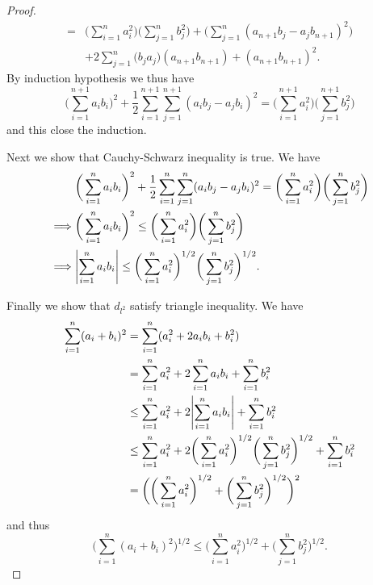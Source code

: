 \begin{proof}
\begin{align*}
        = & \bigg(\sum_{i = 1}^n a_i^2\bigg) \bigg(\sum_{j = 1}^n b_j^2\bigg) + \bigg(\sum_{j = 1}^n (a_{n + 1} b_j - a_j b_{n + 1})^2\bigg)                                                          \\
          & + 2 \sum_{j = 1}^n \bigg(b_j a_j\bigg)(a_{n + 1} b_{n + 1}) + (a_{n + 1} b_{n + 1})^2.
    \end{align*}
    By induction hypothesis we thus have
    \[
        \bigg(\sum_{i = 1}^{n + 1} a_i b_i\bigg)^2 + \frac{1}{2} \sum_{i = 1}^{n + 1} \sum_{j = 1}^{n + 1} (a_i b_j - a_j b_i)^2 = \bigg(\sum_{i = 1}^{n + 1} a_i^2\bigg) \bigg(\sum_{j = 1}^{n + 1} b_j^2\bigg)
    \]
    and this close the induction.

    Next we show that Cauchy-Schwarz inequality is true.
    We have
    \begin{align*}
                 & \bigg(\sum_{i = 1}^n a_i b_i\bigg)^2 + \frac{1}{2} \sum_{i = 1}^n \sum_{j = 1}^n (a_i b_j - a_j b_i)^2 = \bigg(\sum_{i = 1}^n a_i^2\bigg) \bigg(\sum_{j = 1}^n b_j^2\bigg) \\
        \implies & \bigg(\sum_{i = 1}^n a_i b_i\bigg)^2 \leq \bigg(\sum_{i = 1}^n a_i^2\bigg) \bigg(\sum_{j = 1}^n b_j^2\bigg)                                                                \\
        \implies & \abs*{\sum_{i = 1}^n a_i b_i} \leq \bigg(\sum_{i = 1}^n a_i^2\bigg)^{1 / 2} \bigg(\sum_{j = 1}^n b_j^2\bigg)^{1 / 2}.
    \end{align*}

    Finally we show that \(d_{l^2}\) satisfy triangle inequality.
    We have
    \begin{align*}
        \sum_{i = 1}^n (a_i + b_i)^2 & = \sum_{i = 1}^n (a_i^2 + 2 a_i b_i + b_i^2)                                                                                           \\
                                     & = \sum_{i = 1}^n a_i^2 + 2 \sum_{i = 1}^n a_i b_i + \sum_{i = 1}^n b_i^2                                                               \\
                                     & \leq \sum_{i = 1}^n a_i^2 + 2 \abs*{\sum_{i = 1}^n a_i b_i} + \sum_{i = 1}^n b_i^2                                                     \\
                                     & \leq \sum_{i = 1}^n a_i^2 + 2 \bigg(\sum_{i = 1}^n a_i^2\bigg)^{1 / 2} \bigg(\sum_{j = 1}^n b_j^2\bigg)^{1 / 2} + \sum_{i = 1}^n b_i^2 \\
                                     & = \bigg(\bigg(\sum_{i = 1}^n a_i^2\bigg)^{1 / 2} + \bigg(\sum_{j = 1}^n b_j^2\bigg)^{1 / 2}\bigg)^2
    \end{align*}
    and thus
    \[
        \bigg(\sum_{i = 1}^n (a_i + b_i)^2\bigg)^{1 / 2} \leq \bigg(\sum_{i = 1}^n a_i^2\bigg)^{1 / 2} + \bigg(\sum_{j = 1}^n b_j^2\bigg)^{1 / 2}.
    \]
\end{proof}

